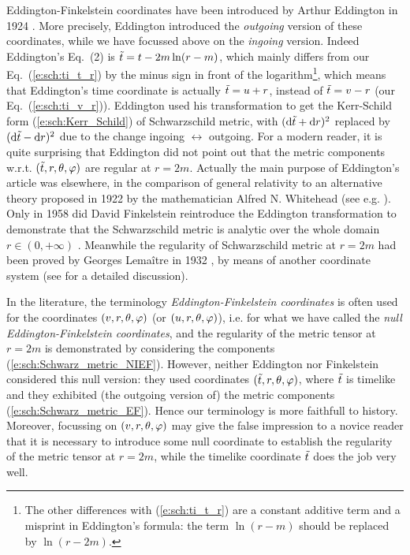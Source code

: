 \begin{hist}
Eddington-Finkelstein coordinates have been introduced by
Arthur Eddington in 1924 \cite{Eddin1924}. More precisely, Eddington
introduced the \emph{outgoing} version of these coordinates,
while we have focussed above on the \emph{ingoing} version. Indeed
Eddington's Eq.~(2) is ${\tilde t} = t - 2m \ln(r-m)$, which mainly differs from
our Eq.~(\ref{e:sch:ti_t_r}) by the minus sign in front of the logarithm\footnote{The other differences with (\ref{e:sch:ti_t_r}) are a constant additive term
and a misprint in Eddington's formula: the term $\ln(r-m)$ should be replaced
by $\ln(r-2m)$.},
which means that Eddington's time coordinate is actually ${\tilde t} = u + r$, instead of
${\tilde t} = v - r$ (our Eq.~(\ref{e:sch:ti_v_r})). Eddington used his transformation
to get the Kerr-Schild form (\ref{e:sch:Kerr_Schild}) of Schwarzschild metric,
with $(\mathrm{d} {\tilde t} + \mathrm{d} r)^2$ replaced by $(\mathrm{d} {\tilde t} - \mathrm{d} r)^2$ due to the change
ingoing $\leftrightarrow$ outgoing. For a modern reader, it is quite surprising
that Eddington did not point out that the metric components w.r.t. $({\tilde t},r,\theta,\varphi)$
are regular at $r=2m$. Actually the main purpose of Eddington's article
\cite{Eddin1924} was elsewhere, in the comparison of general relativity to an alternative theory proposed in 1922 by the mathematician Alfred N. Whitehead
(see e.g. \cite{GibboW08}).
Only in 1958 did David Finkelstein reintroduce the Eddington transformation
to demonstrate that the Schwarzschild metric is analytic over the whole domain
$r\in(0,+\infty)$ \cite{Finke58}. Meanwhile the regularity of Schwarzschild metric
at $r=2m$ had been proved by Georges Lemaître in 1932 \cite{Lemai32}, by means of
another coordinate system (see \cite{Eisen93} for a detailed discussion).
\end{hist}

\begin{remark}
In the literature, the terminology \emph{Eddington-Finkelstein coordinates}
is often used for the coordinates $(v,r,\theta,\varphi)$ (or $(u,r,\theta,\varphi)$),
i.e. for what we have called the \emph{null Eddington-Finkelstein coordinates},
and the regularity of the metric tensor at $r=2m$ is demonstrated by
considering the components (\ref{e:sch:Schwarz_metric_NIEF}).
However, neither
Eddington \cite{Eddin1924} nor Finkelstein \cite{Finke58}
considered this null version: they used coordinates $({\tilde t},r,\theta,\varphi)$, where
${\tilde t}$ is timelike and they exhibited (the outgoing version of) the
metric components (\ref{e:sch:Schwarz_metric_EF}).
Hence our terminology is more faithfull to history. Moreover, focussing on
$(v,r,\theta,\varphi)$ may give the false impression to a novice reader that it is
necessary to introduce some null coordinate to establish the regularity
of the metric tensor at $r=2m$, while the timelike coordinate ${\tilde t}$
does the job very well.
\end{remark}

